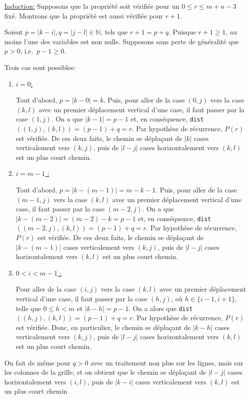 \documentclass[12pt,a4paper]{article}
\begin{document}
\underline{Induction:} Supposons que la propri\'et\'e soit v\'erifi\'ee pour un 
$0 \leq r \leq m+n-3$ fix\'e.
Montrons que la propri\'et\'e est aussi v\'erifi\'ee pour $r+1$.

Soient $p=|k-i|, q=|j-l| \in \mathbb{N}$, tels que $r+1=p+q$. Puisque 
$r+1 \geq1$, au moins l'une des variables est non nulle. Supposons sans perte 
de g\'en\'eralit\'e que $p > 0$, i.e.\ $p-1 \geq 0$.

Trois cas sont possibles:
\begin{enumerate}
  \item \underline{$i=0$:} 

  Tout d'abord, $p=|k-0|=k$. Puis, pour aller de la case $(0,j)$ vers la case 
$(k,l)$ avec un premier   d\'eplacement vertical d'une case, il faut passer par 
la case $(1,j)$. On a que $|k-1|=p-1$ et, en 
cons\'equence, \texttt{dist}$((1,j),(k,l))=(p-1)+q=r$. Par 
hypoth\`ese de r\'ecurrence, $P(r)$ est v\'erifi\'ee. De ces deux faits, le 
chemin se d\'epla\c{c}ant de $|k|$ cases verticalement vers $(k,j)$, puis de 
$|l-j|$ cases horizontalement vers $(k,l)$ est un plus court chemin.
  \item \underline{$i=m-1$ :} 

  Tout d'abord, $p=|k-(m-1)|=m-k-1$. Puis, pour aller de la case $(m-1,j)$ vers 
la case $(k,l)$ avec un premier d\'eplacement vertical d'une case, il faut 
passer par la case $(m-2,j)$. On a que $|k-(m-2)|=(m-2)-k=p-1$ et, en 
cons\'equence, \texttt{dist}$((m-2,j),(k,l))=(p-1)+q=r$. Par hypoth\`ese de 
  r\'ecurrence, $P(r)$ est v\'erifi\'ee. De ces deux faits, le chemin se 
  d\'epla\c{c}ant de $|k-(m-1)|$ cases verticalement vers $(k,j)$, puis de 
$|l-j|$ cases horizontalement vers $(k,l)$ est un plus court chemin.
  \item \underline{$0 < i <  m-1$ :}

  Pour aller de la case $(i,j)$ vers la case $(k,l)$ avec un premier 
d\'eplacement vertical d'une case, il faut passer par la case $(h,j)$, 
o\`u $h \in \{i-1, i+1\}$, telle que $0 \leq h < m$ et $|k-h|=p-1$. On a alors 
que \texttt{dist}$((h,j),(k,l))=(p-1)+q=r$. Par hypoth\`ese de 
r\'ecurrence, $P(r)$ est v\'erifi\'ee. Donc, en particulier, le chemin se 
d\'epla\c{c}ant de $|k-h|$ cases verticalement vers $(k,j)$, puis de $|l-j|$ 
cases horizontalement vers $(k,l)$ est un plus court chemin.
\end{enumerate}
On fait de m\^eme pour $q>0$ avec un traitement non plus sur les lignes, mais 
sur les colonnes de la grille, et on obtient que le chemin se d\'epla\c{c}ant de 
$|l-j|$ cases horizontalement vers $(i,l)$, puis de $|k-i|$ cases verticalement 
vers $(k,l)$ est un plus court chemin
\end{document}

